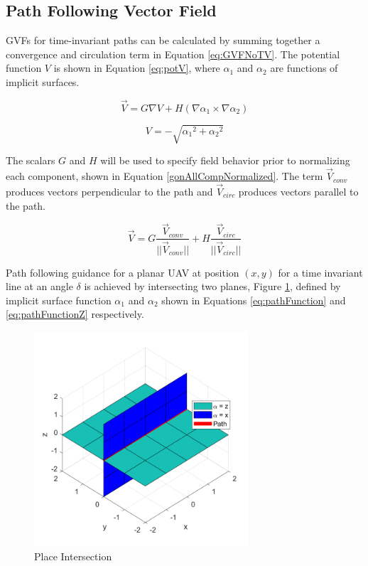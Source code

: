 \documentclass[numbered,pdftex]{ohio-etd}
\begin{document}
\subsection{Path Following Vector Field}
GVFs for time-invariant paths can be calculated by summing together a convergence and circulation term in Equation \ref{eq:GVFNoTV}. The potential function $V$ is shown in Equation \ref{eq:potV}, where $\alpha_1$ and $\alpha_2$ are functions of implicit surfaces.

\begin{equation}\label{eq:GVFNoTV}
\overrightarrow{V} = G \nabla V + H(\nabla\alpha_1 \times \nabla\alpha_2)
\end{equation}

\begin{equation}
V = -\sqrt{{\alpha_1}^2 + {\alpha_2}^2}
\label{eq:potV}
\end{equation}


\noindent
The scalars $G$ and $H$ will be used to specify field behavior prior to normalizing each component, shown in Equation \ref{gonAllCompNormalized}. The term $\overrightarrow{V}_{conv}$ produces vectors perpendicular to the path and $\overrightarrow{V}_{circ}$ produces vectors parallel to the path. 

\begin{equation}
\overrightarrow{V} = G \frac{\overrightarrow{V}_{conv}}{||\overrightarrow{V}_{conv}||} +H\frac{\overrightarrow{V}_{circ}}{||\overrightarrow{V}_{circ}||}
\label{gonAllCompNormalized}
\end{equation}



Path following guidance for a planar UAV at position $(x,y)$ for a time invariant line at an angle $\delta$ is achieved by intersecting two planes, Figure \ref{fig:planeIntersection}, defined by implicit surface function $\alpha_1$ and $\alpha_2$ shown in Equations \ref{eq:pathFunction} and \ref{eq:pathFunctionZ} respectively.

\begin{figure}[H]
	\centering
	\includegraphics[width=8cm]{Figures/planeIntersection}
	\caption{Place Intersection}
	\label{fig:planeIntersection}
\end{figure}
\end{document}
